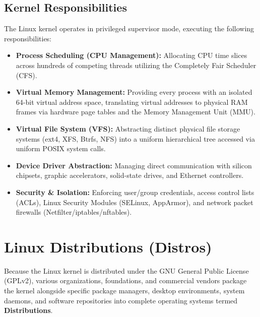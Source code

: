 \subsection{Kernel Responsibilities}
The Linux kernel operates in privileged supervisor mode, executing the following responsibilities:
\begin{itemize}[leftmargin=1.5em]
    \item \textbf{Process Scheduling (CPU Management):} Allocating CPU time slices across hundreds of competing threads utilizing the Completely Fair Scheduler (CFS).
    \item \textbf{Virtual Memory Management:} Providing every process with an isolated 64-bit virtual address space, translating virtual addresses to physical RAM frames via hardware page tables and the Memory Management Unit (MMU).
    \item \textbf{Virtual File System (VFS):} Abstracting distinct physical file storage systems (ext4, XFS, Btrfs, NFS) into a uniform hierarchical tree accessed via uniform POSIX system calls.
    \item \textbf{Device Driver Abstraction:} Managing direct communication with silicon chipsets, graphic accelerators, solid-state drives, and Ethernet controllers.
    \item \textbf{Security \& Isolation:} Enforcing user/group credentials, access control lists (ACLs), Linux Security Modules (SELinux, AppArmor), and network packet firewalls (Netfilter/iptables/nftables).
\end{itemize}


\section{Linux Distributions (Distros)}
Because the Linux kernel is distributed under the GNU General Public License (GPLv2), various organizations, foundations, and commercial vendors package the kernel alongside specific package managers, desktop environments, system daemons, and software repositories into complete operating systems termed \textbf{Distributions}.

